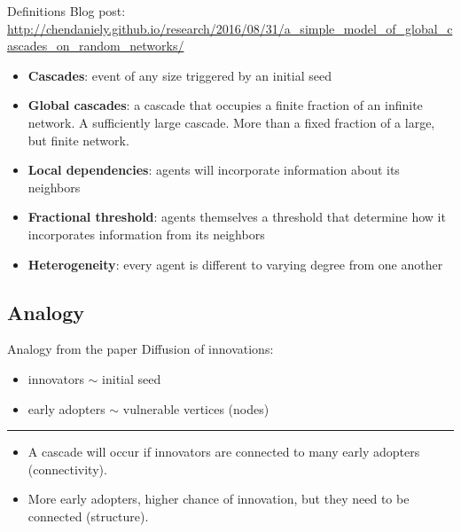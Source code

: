 \documentclass[compress]{beamer}
\begin{document}
    \begin{frame}[Basic2]{Definitions}
        Blog post:\\ \tiny{\url{http://chendaniely.github.io/research/2016/08/31/a_simple_model_of_global_cascades_on_random_networks/}}
        \vspace{2mm}
        \footnotesize
        \begin{itemize}
            \item \textbf{Cascades}: event of any size triggered by an initial seed
            \item \textbf{Global cascades}: a cascade that occupies a finite fraction of an infinite network. A sufficiently large cascade. More than a fixed fraction of a large, but finite network.
            \item \textbf{Local dependencies}: agents will incorporate information about its neighbors
            \item \textbf{Fractional threshold}: agents themselves a threshold that determine how it incorporates information from its neighbors
            \item \textbf{Heterogeneity}: every agent is different to varying degree from one another
        \end{itemize}
    \end{frame}

\subsection{Analogy}

    \begin{frame}[Basic2]{Analogy from the paper}
        Diffusion of innovations:
        
        \begin{itemize}
            \item innovators $\sim$ initial seed
            \item early adopters $\sim$ vulnerable vertices (nodes)
        \end{itemize}
        
        \rule{\textwidth}{1pt}
        
        \begin{itemize}
            \item A cascade will occur if innovators are connected to many early adopters (connectivity).
            \item More early adopters, higher chance of innovation, but they need to be connected (structure).
        \end{itemize}
    \end{frame}
\end{document}
